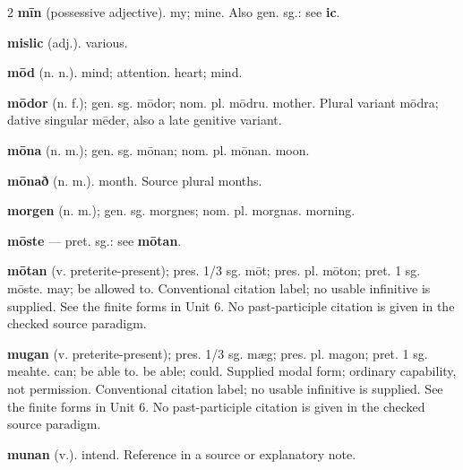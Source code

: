 \begin{multicols*}{2}
\textbf{mīn} (possessive adjective). my; mine. Also gen. sg.: see \textbf{ic}.\par
\textbf{mislic} (adj.). various.\par
\textbf{mōd} (n. n.). mind; attention. heart; mind.\par
\textbf{mōdor} (n. f.); gen. sg. mōdor; nom. pl. mōdru. mother. Plural variant mōdra; dative singular mēder, also a late genitive variant.\par
\textbf{mōna} (n. m.); gen. sg. mōnan; nom. pl. mōnan. moon.\par
\textbf{mōnað} (n. m.). month. Source plural months.\par
\textbf{morgen} (n. m.); gen. sg. morgnes; nom. pl. morgnas. morning.\par
\textbf{mōste} — pret. sg.: see \textbf{mōtan}.\par
\textbf{mōtan} (v. preterite-present); pres. 1/3 sg. mōt; pres. pl. mōton; pret. 1 sg. mōste. may; be allowed to. Conventional citation label; no usable infinitive is supplied. See the finite forms in Unit 6. No past-participle citation is given in the checked source paradigm.\par
\textbf{mugan} (v. preterite-present); pres. 1/3 sg. mæg; pres. pl. magon; pret. 1 sg. meahte. can; be able to. be able; could. Supplied modal form; ordinary capability, not permission. Conventional citation label; no usable infinitive is supplied. See the finite forms in Unit 6. No past-participle citation is given in the checked source paradigm.\par
\textbf{munan} (v.). intend. Reference in a source or explanatory note.\par

\end{multicols*}
